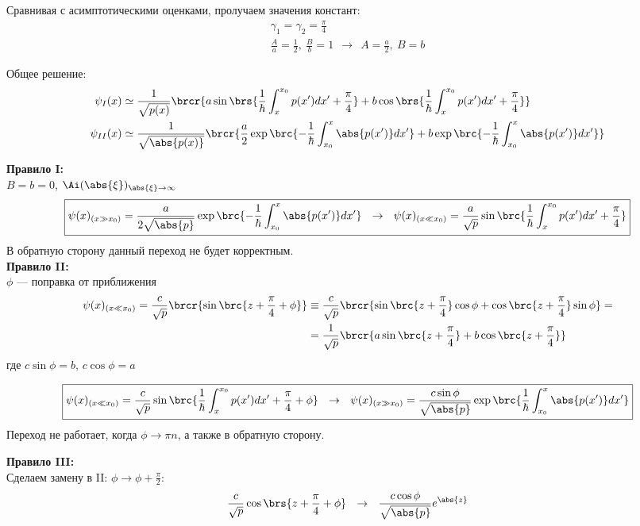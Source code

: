 Сравнивая с асимптотическими оценками, пролучаем значения констант:
$$
\begin{gathered}
\gamma_1 = \gamma_2 = \frac{\pi}{4}\\
\frac{A}{a} = \frac{1}{2},~ \frac{B}{b} = 1 ~~\rightarrow~~ \boxed{A = \frac{a}{2},~ B = b}
\end{gathered}
$$

Общее решение:
$$
\begin{aligned}
\psi_{I}(x) &\simeq \frac{1}{\sqrt{p(x)}} \brcr{ a \sin\brs{\frac{1}{\hbar} \int_x^{x_0} p(x')dx'+\frac{\pi}{4}} + b \cos\brs{\frac{1}{\hbar} \int_x^{x_0} p(x')dx'+\frac{\pi}{4}} } \\
\psi_{II}(x) &\simeq \frac{1}{\sqrt{\abs{p(x)}}} \brcr{ \frac{a}{2} \exp\brc{-\frac{1}{\hbar} \int^x_{x_0} \abs{p(x')}dx'} + b \exp\brc{-\frac{1}{\hbar} \int^x_{x_0} \abs{p(x')}dx'} }
\end{aligned}
$$

\textbf{Правило I:} \\
$B = b = 0$, $\Ai(\abs{\xi})_{\abs{\xi} \to \infty}$
$$
\boxed{
	\psi(x)_{(x \gg x_0)} = \frac{a}{2 \sqrt{\abs{p}}} \exp\brc{-\frac{1}{\hbar} \int_{x_0}^{x} \abs{p(x')}dx'} ~~\rightarrow~~
	\psi(x)_{(x \ll x_0)} = \frac{a}{\sqrt{p}} \sin\brc{\frac{1}{\hbar} \int_{x}^{x_0} p(x')dx' + \frac{\pi}{4}}
}
$$
В обратную сторону данный переход не будет корректным.
\\

\textbf{Правило II:} \\
$\phi$ --- поправка от приближения
$$
\begin{aligned}
\psi(x)_{(x \ll x_0)} = \frac{c}{\sqrt{p}} \brcr{\sin\brc{z+\frac{\pi}{4}+\phi}} &\equiv
\frac{c}{\sqrt{p}} \brcr{\sin\brc{z+\frac{\pi}{4}}\cos{\phi} + \cos\brc{z+\frac{\pi}{4}}\sin{\phi}} =\\
&=\frac{1}{\sqrt{p}} \brcr{a \sin\brc{z+\frac{\pi}{4}} + b \cos\brc{z+\frac{\pi}{4}}}
\end{aligned}
$$
где $c\sin{\phi}=b$, $c\cos{\phi}=a$

$$
\boxed{
	\psi(x)_{(x \ll x_0)} = \frac{c}{\sqrt{p}} \sin\brc{\frac{1}{\hbar} \int_{x}^{x_0} p(x')dx' + \frac{\pi}{4} + \phi} ~~\rightarrow~~
	\psi(x)_{(x \gg x_0)} = \frac{c \sin{\phi}}{\sqrt{\abs{p}}} \exp\brc{\frac{1}{\hbar} \int_{x_0}^{x} \abs{p(x')}dx'}
}
$$
Переход не работает, когда $\phi \to \pi n$, а также в обратную сторону.

\textbf{Правило III:} \\
Сделаем замену в II: $\phi \to \phi + \frac{\pi}{2}$:
$$
\frac{c}{\sqrt{p}}\cos\brs{z+\frac{\pi}{4} + \phi} ~~\rightarrow~~ \frac{c\cos{\phi}}{\sqrt{\abs{p}}} e^{\abs{z}}
$$

